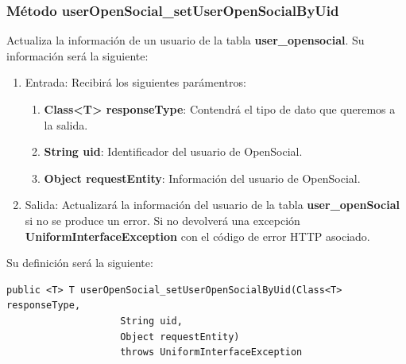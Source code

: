\subsubsection{Método userOpenSocial\_setUserOpenSocialByUid}
Actualiza la información de un usuario de la tabla \textbf{user\_opensocial}. Su información será la siguiente:
\begin{enumerate}
\item Entrada: Recibirá los siguientes parámentros:
\begin{enumerate}
\item \textbf{Class<T> responseType}: Contendrá el tipo de dato que queremos a la salida.
\item \textbf{String uid}: Identificador del usuario de OpenSocial.
\item \textbf{Object requestEntity}: Información del usuario de OpenSocial.

\end{enumerate}
\item Salida: Actualizará la información del usuario de la tabla \textbf{user\_openSocial} si no se produce un error. Si no devolverá una excepción \textbf{UniformInterfaceException} con el código de error HTTP asociado.
\end{enumerate}
\bigskip
\par
Su definición será la siguiente:
\begin{verbatim}public <T> T userOpenSocial_setUserOpenSocialByUid(Class<T> responseType, 
					String uid, 
					Object requestEntity) 
					throws UniformInterfaceException \end{verbatim}
